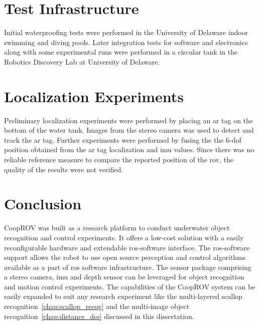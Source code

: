 \documentclass {udthesis}
\begin{document}
\section{Test Infrastructure}

Initial waterproofing tests were performed in the University of Delaware indoor swimming and diving pools. Later integration tests for software and electronics along with some experimental runs were performed in a circular tank in the Robotics Discovery Lab at University of Delaware.


\section{Localization Experiments}

Preliminary localization experiments were performed by placing an \gls{ar} tag on the bottom of the water tank. Images from the stereo camera was used to detect and track the \gls{ar} tag. Further experiments were performed by fusing the the 6-\gls{dof} position obtained from the \gls{ar} tag localization and \gls{imu} values. Since there was no reliable reference measure to compare the reported position of the \gls{rov}, the quality of the results were not verified.


\section{Conclusion}

CoopROV was built as a research platform to conduct underwater object recognition and control experiments. It offers a low-cost solution with a easily reconfigurable hardware and extendable \gls{ros}-software interface. The \gls{ros}-software support allows the robot to use open source perception and control algorithms available as a part of \gls{ros} software infrastructure. The sensor package comprising a stereo camera, \gls{imu} and depth sensor can be leveraged for object recognition and motion control experiments. The capabilities of the CoopROV system can be easily expanded to suit any research experiment like the multi-layered scallop recognition~\ref{chap:scallop_recog} and the multi-image object recognition~\ref{chap:distance_des} discussed in this dissertation.

\printglossary[type=\acronymtype]                  
\end{document}
